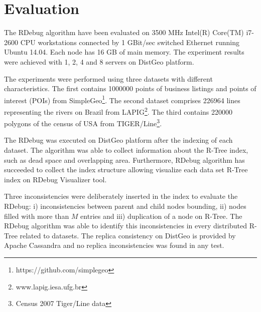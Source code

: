 \section{Evaluation}
\label{sec:evaluation}	

The RDebug algorithm have been evaluated on 3500 MHz Intel(R) Core(TM) i7-2600 CPU workstations
connected by 1 GBit/sec switched Ethernet running Ubuntu 14.04. Each node has 16 GB of main memory.
The experiment results were achieved with 1, 2, 4 and 8 servers on DistGeo platform.

The experiments were performed using three datasets with different characteristics.
The first contains 1000000 points of business listings and points of interest (POIs) from SimpleGeo\footnote{https://github.com/simplegeo}.
The second dataset comprises 226964 lines representing the rivers on Brazil from LAPIG\footnote{www.lapig.iesa.ufg.br}. 
The third contains 220000 polygons of the census of USA from TIGER/Line\footnote{Census 2007 Tiger/Line data}.

The RDebug was executed on DistGeo platform after the indexing of each dataset.
The algorithm was able to collect information about the R-Tree index, such as dead space and overlapping area.
Furthermore, RDebug algorithm has succeeded to collect the index structure allowing visualize each data set R-Tree index on RDebug Visualizer tool.

Three inconsistencies were deliberately inserted in the index to evaluate the RDebug: 
i) inconsistencies between parent and child nodes bounding, ii) nodes filled with more than $M$ entries and iii) duplication of a node on R-Tree. 
The RDebug algorithm was able to identify this inconsistencies in every distributed R-Tree related to datasets. 
The replica consistency on DistGeo is provided by Apache Cassandra \cite{cassandra1apache} and no replica inconsistencies was found in any test. 

